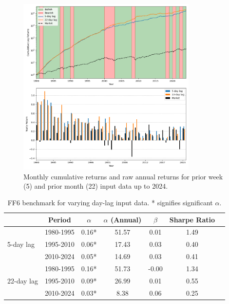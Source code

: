 \documentclass{article}
\begin{document}
\newpage

\begin{figure}[H]
    \centering
    \includegraphics[width=0.8\textwidth]{2024_plot4_seq_len_comparison.png}
    \caption{Monthly cumulative returns and raw annual returns for prior week (5) and prior month (22) input data up to 2024.}
    \label{fig:seq_len_comp}
\end{figure}

\begin{table}[h]
    \centering
    \begin{tabular}{lcccccc}
        \toprule
        & Period & $\alpha$ & $\alpha$ (Annual) & $\beta$ & Sharpe Ratio \\
        \midrule
        \multirow{3}{*}{5-day lag} & 1980-1995 & 0.16* & 51.57 & 0.01 & 1.49 \\
                                   & 1995-2010 & 0.06* & 17.43 & 0.03 & 0.40 \\
                                   & 2010-2024 & 0.05* & 14.69 & 0.03 & 0.41 \\
        \midrule
        \multirow{3}{*}{22-day lag} & 1980-1995 & 0.16* & 51.73 & -0.00 & 1.34 \\
                                    & 1995-2010 & 0.09* & 26.99 & 0.01 & 0.55 \\
                                    & 2010-2024 & 0.03* & 8.38 & 0.06 & 0.25 \\
        \bottomrule
    \end{tabular}
    \caption{FF6 benchmark for varying day-lag input data. * signifies significant $\alpha$.}
    \label{tab:input_day_lag_comparison}
\end{table}
\end{document}
